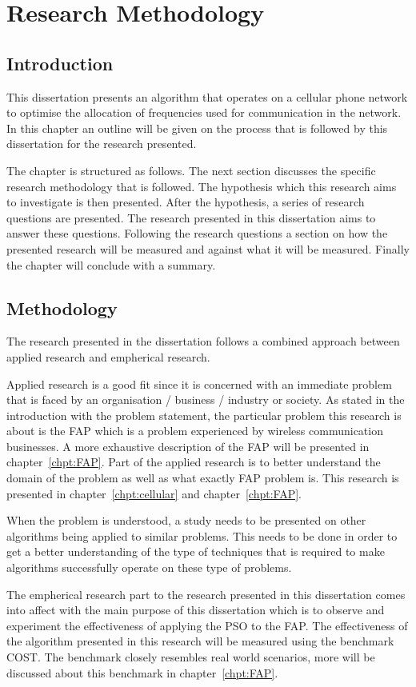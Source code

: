 \chapter{Research Methodology}
\section{Introduction}
This dissertation presents an algorithm that operates on a cellular phone network to optimise the allocation of frequencies used for communication in the network. In this chapter an outline will be given on the process that is followed by this dissertation for the research presented.

The chapter is structured as follows. The next section discusses the specific research methodology that is followed. The hypothesis which this research aims to investigate is then presented. After the hypothesis, a series of research questions are presented. The research presented in this dissertation aims to answer these questions.
Following the research questions a section on how the presented research will be measured and against what it will be measured. Finally the chapter will conclude with a summary.
\section{Methodology}
The research presented in the dissertation follows a combined approach between applied research and empherical research. 

Applied research is a good fit since it is concerned with an immediate problem that is faced by an organisation / business / industry or society. As stated in the introduction with the problem statement, the particular problem this research is about is the \gls{FAP} which is a problem experienced by wireless communication businesses. A more exhaustive description of the \gls{FAP} will be presented in chapter~\ref{chpt:FAP}.
Part of the applied research is to better understand the domain of the problem as well as what exactly \gls{FAP} problem is. This research is presented in chapter~\ref{chpt:cellular} and chapter~\ref{chpt:FAP}.

When the problem is understood, a study needs to be presented on other algorithms being applied to similar problems. This needs to be done in order to get a better understanding of the type of techniques that is required to make algorithms successfully operate on these type of problems.

The empherical research part to the research presented in this dissertation comes into affect with the main purpose of this dissertation which is to observe and experiment the effectiveness of applying the \gls{PSO} to the \gls{FAP}. The effectiveness of the algorithm presented in this research will be measured using the benchmark \gls{COST}. The benchmark closely resembles real world scenarios, more will be discussed about this benchmark in chapter~\ref{chpt:FAP}.

